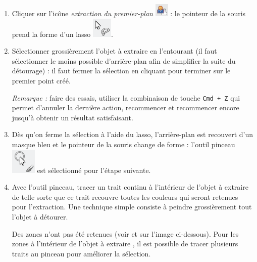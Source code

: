 \begin{enumerate}
\item Cliquer sur l'icône \emph{extraction du premier-plan} \includegraphics[width=.7cm]{./images/image03/iconeDetoure} : le pointeur de la souris prend la forme d'un lasso \includegraphics[width=.7cm]{./images/image03/iconeLasso}.
\item Sélectionner grossièrement l'objet à extraire en l'entourant (il faut sélectionner le moins possible d'arrière-plan afin de simplifier la suite du détourage) : il faut fermer la sélection en cliquant pour terminer sur le premier point créé.

\vspace{6pt}

\emph{Remarque :} faire des essais, utiliser la combinaison de touche \texttt{Cmd + Z} qui permet d'annuler la dernière action, recommencer et recommencer encore jusqu'à obtenir un résultat satisfaisant.

\vspace{6pt}

\item Dès qu'on ferme la sélection à l'aide du lasso, l'arrière-plan est recouvert d'un masque bleu et le pointeur de la souris change de forme : l'outil pinceau \includegraphics[width=.7cm]{./images/image03/iconePinceau} est sélectionné pour l'étape suivante. 


\item Avec l'outil pinceau, tracer un trait continu à l'intérieur de l'objet à extraire de telle sorte que ce trait recouvre toutes les couleurs qui seront retenues pour l'extraction. Une technique simple consiste à peindre grossièrement tout l'objet à détourer.

\vspace{6pt}

Des zones n'ont pas été retenues (voir  et  sur l'image ci-dessous). Pour les zones à l'intérieur de l'objet à extraire , il est possible de tracer plusieurs traits au pinceau pour améliorer la sélection.


\end{enumerate}
